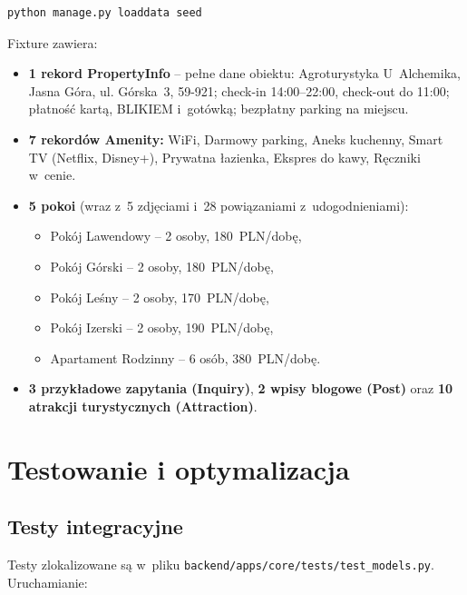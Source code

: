 \documentclass[12pt,a4paper]{article}
\begin{document}
\begin{lstlisting}[style=consolestyle, caption={Ładowanie danych testowych}]
python manage.py loaddata seed
\end{lstlisting}

Fixture zawiera:

\begin{itemize}[nosep]
  \item \textbf{1 rekord PropertyInfo} -- pełne dane obiektu: Agroturystyka U~Alchemika,
    Jasna Góra, ul. Górska~3, 59-921; check-in 14:00--22:00, check-out do 11:00;
    płatność kartą, BLIKIEM i~gotówką; bezpłatny parking na miejscu.

  \item \textbf{7 rekordów Amenity:}
    WiFi, Darmowy parking, Aneks kuchenny, Smart TV (Netflix, Disney+),
    Prywatna łazienka, Ekspres do kawy, Ręczniki w~cenie.

  \item \textbf{5 pokoi} (wraz z~5 zdjęciami i~28 powiązaniami z~udogodnieniami):
    \begin{itemize}[nosep]
      \item Pokój Lawendowy -- 2 osoby, 180~PLN/dobę,
      \item Pokój Górski -- 2 osoby, 180~PLN/dobę,
      \item Pokój Leśny -- 2 osoby, 170~PLN/dobę,
      \item Pokój Izerski -- 2 osoby, 190~PLN/dobę,
      \item Apartament Rodzinny -- 6 osób, 380~PLN/dobę.
    \end{itemize}

  \item \textbf{3 przykładowe zapytania (Inquiry)}, \textbf{2 wpisy blogowe (Post)}
    oraz \textbf{10 atrakcji turystycznych (Attraction)}.
\end{itemize}

\section{Testowanie i optymalizacja}

\subsection{Testy integracyjne}

Testy zlokalizowane są w~pliku
\texttt{backend/apps/core/tests/test\_models.py}.
Uruchamianie:
\end{document}
